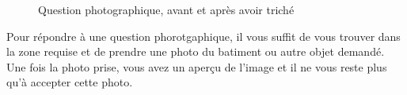 \documentclass[11pt]{scrreprt}
\begin{document}
\begin{figure}[H]
{        }
        \caption{Question photographique, avant et après avoir triché}
    \end{figure}

    Pour répondre à une question phorotgaphique, il vous suffit de vous trouver dans la zone requise et de prendre une photo du batiment ou autre objet demandé. Une fois la photo prise, vous avez un aperçu de l'image et il ne vous reste plus qu'à accepter cette photo.\\
\end{document}
